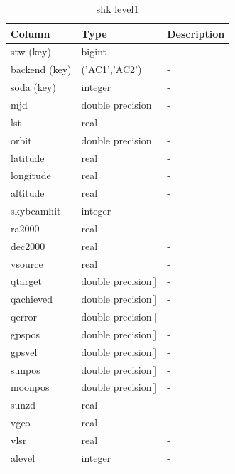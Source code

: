 \documentclass[12pt]{article}
\begin{document}
\begin{table}
\begin{tiny}
\begin{subtable}{.9\linewidth}
       \begin{tabular}{l l l}
\hline\hline
Column & Type & Description \\ [0.5ex]
\hline
 stw (key)  & bigint             & - \\
 backend (key) & ('AC1','AC2')   & - \\
 soda (key) & integer            & - \\
 mjd        & double precision   & - \\  
 lst        & real               & - \\   
 orbit      & double precision   & - \\   
 latitude   & real               & - \\    
 longitude  & real               & - \\    
 altitude   & real               & - \\    
 skybeamhit & integer            & - \\    
 ra2000     & real               & - \\    
 dec2000    & real               & - \\    
 vsource    & real               & - \\    
 qtarget    & double precision[] & - \\ 
 qachieved  & double precision[] & - \\ 
 qerror     & double precision[] & - \\ 
 gpspos     & double precision[] & - \\    
 gpsvel     & double precision[] & - \\  
 sunpos     & double precision[] & - \\  
 moonpos    & double precision[] & - \\  
 sunzd      & real               & - \\  
 vgeo       & real               & - \\ 
 vlsr       & real               & - \\ 
 alevel     & integer            & -\\[1ex]
\hline
\end{tabular}
 
       
    \end{subtable}%
   \newline
   \newline

   \begin{subtable}{.9\linewidth}
      \captionsetup{font=scriptsize}
      \centering
      \label{table:shk1}
\caption{shk\underline{ }level1}


\end{subtable}
\end{tiny}
\end{table}
\end{document}
